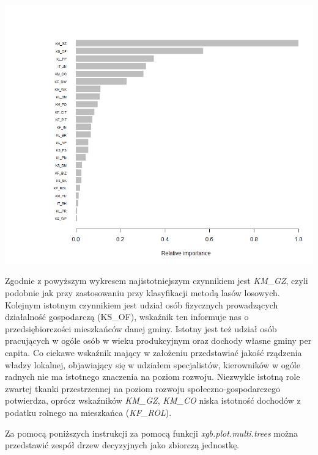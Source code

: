 \documentclass{amuthesis}
\begin{document}
\begin{center}\includegraphics[width=1\linewidth]{figures/xgboost} \end{center}

Zgodnie z powyższym wykresem najistotniejszym czynnikiem jest \emph{KM\_GZ}, czyli podobnie jak przy zastosowaniu przy klasyfikacji metodą lasów losowych.
Kolejnym istotnym czynnikiem jest udział osób fizycznych prowadzących działalność gospodarczą (KS\_OF), wskaźnik ten informuje nas o przedsiębiorczości mieszkańców danej gminy.
Istotny jest też udział osób pracujących w ogóle osób w wieku produkcyjnym oraz dochody własne gminy per capita.
Co ciekawe wskaźnik mający w założeniu przedstawiać jakość rządzenia władzy lokalnej, objawiający się w udziałem specjalistów, kierowników w ogóle radnych nie ma istotnego znaczenia na poziom rozwoju.
Niezwykle istotną role zwartej tkanki przestrzennej na poziom rozwoju społeczno-gospodarczego potwierdza, oprócz wskaźników \emph{KM\_GZ}, \emph{KM\_CO} niska istotność dochodów z podatku rolnego na mieszkańca (\emph{KF\_ROL}).

Za pomocą poniższych instrukcji za pomocą funkcji \emph{xgb.plot.multi.trees} można przedstawić zespół drzew decyzyjnych jako zbiorczą jednostkę.

\begin{Shaded}
\begin{Highlighting}[]
\SpecialCharTok{::}\NormalTok{(}
\end{Highlighting}
\end{Shaded}
\end{document}
